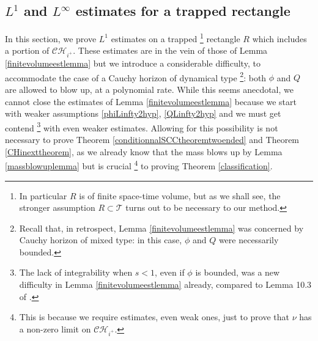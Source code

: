 \documentclass[10pt,a4paper]{article}
\theoremstyle{plain}
\theoremstyle{remark}
\theoremstyle{definition}
\theoremstyle{plain}
\theoremstyle{remark}
\theoremstyle{definition}
\newcommand{\CH}{\mathcal{CH}_{i^+}}
\numberwithin{equation}{section}
\begin{document}
\subsection{$L^1$ and $L^{\infty}$ estimates for a trapped rectangle}

In this section, we prove $L^1$ estimates on a trapped \footnote{In particular $R$ is of finite space-time volume, but as we shall see, the stronger assumption $R \subset \mathcal{T}$ turns out to be necessary to our method.} rectangle $R$  which includes a portion of $\CH$. These estimates are in the vein of those of Lemma \ref{finitevolumeestlemma} but we introduce a considerable difficulty, to accommodate the case of a Cauchy horizon of dynamical type \footnote{Recall that, in retrospect, Lemma \ref{finitevolumeestlemma} was concerned by Cauchy horizon of mixed type: in this case, $\phi$ and $Q$ were necessarily bounded.}: both $\phi$ and $Q$ are allowed to blow up, at a polynomial rate. While this seems anecdotal, we cannot close the estimates of Lemma \ref{finitevolumeestlemma} because we start with weaker assumptions \eqref{phiLinfty2hyp}, \eqref{QLinfty2hyp} and we must get contend \footnote{The lack of integrability when $s<1$, even if  $\phi$ is bounded, was a new difficulty in Lemma \ref{finitevolumeestlemma} already, compared to Lemma 10.3 of \cite{JonathanStab}.} with even weaker estimates. Allowing for this possibility is not necessary to prove Theorem \ref{conditionnalSCCtheoremtwoended} and Theorem \ref{CHinexttheorem}, as we already know that the mass blows up by Lemma \ref{massblowuplemma} but is crucial \footnote{This is because we require estimates, even weak ones, just to prove that $\nu$ has a non-zero limit on $\CH$.} to proving Theorem \ref{classification}. 
\end{document}
